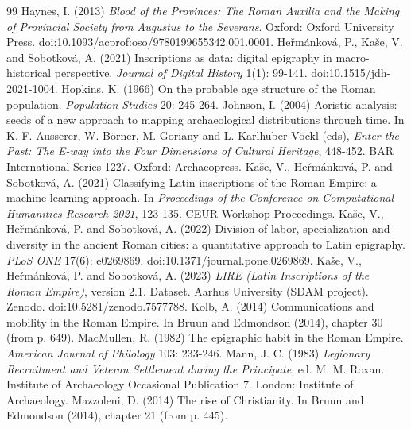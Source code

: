 \documentclass[11pt,a4paper]{article}
\begin{document}
\begin{thebibliography}{99}
 Haynes, I. (2013) \textit{Blood of the Provinces: The Roman Auxilia and the Making of Provincial Society from Augustus to the Severans}. Oxford: Oxford University Press. doi:10.1093/acprof:oso/9780199655342.001.0001.
 He{\v r}m{\'a}nkov{\'a}, P., Ka{\v s}e, V. and Sobotkov{\'a}, A. (2021) Inscriptions as data: digital epigraphy in macro-historical perspective. \textit{Journal of Digital History} 1(1): 99-141. doi:10.1515/jdh-2021-1004.
 Hopkins, K. (1966) On the probable age structure of the Roman population. \textit{Population Studies} 20: 245-264.
 Johnson, I. (2004) Aoristic analysis: seeds of a new approach to mapping archaeological distributions through time. In K. F. Ausserer, W. B{\"o}rner, M. Goriany and L. Karlhuber-V{\"o}ckl (eds), \textit{Enter the Past: The E-way into the Four Dimensions of Cultural Heritage}, 448-452. BAR International Series 1227. Oxford: Archaeopress.
 Ka{\v s}e, V., He{\v r}m{\'a}nkov{\'a}, P. and Sobotkov{\'a}, A. (2021) Classifying Latin inscriptions of the Roman Empire: a machine-learning approach. In \textit{Proceedings of the Conference on Computational Humanities Research 2021}, 123-135. CEUR Workshop Proceedings.
 Ka{\v s}e, V., He{\v r}m{\'a}nkov{\'a}, P. and Sobotkov{\'a}, A. (2022) Division of labor, specialization and diversity in the ancient Roman cities: a quantitative approach to Latin epigraphy. \textit{PLoS ONE} 17(6): e0269869. doi:10.1371/journal.pone.0269869.
 Ka{\v s}e, V., He{\v r}m{\'a}nkov{\'a}, P. and Sobotkov{\'a}, A. (2023) \textit{LIRE (Latin Inscriptions of the Roman Empire)}, version 2.1. Dataset. Aarhus University (SDAM project). Zenodo. doi:10.5281/zenodo.7577788.
 Kolb, A. (2014) Communications and mobility in the Roman Empire. In Bruun and Edmondson (2014), chapter 30 (from p. 649).
 MacMullen, R. (1982) The epigraphic habit in the Roman Empire. \textit{American Journal of Philology} 103: 233-246.
 Mann, J. C. (1983) \textit{Legionary Recruitment and Veteran Settlement during the Principate}, ed. M. M. Roxan. Institute of Archaeology Occasional Publication 7. London: Institute of Archaeology.
 Mazzoleni, D. (2014) The rise of Christianity. In Bruun and Edmondson (2014), chapter 21 (from p. 445).

\end{thebibliography}
\end{document}

